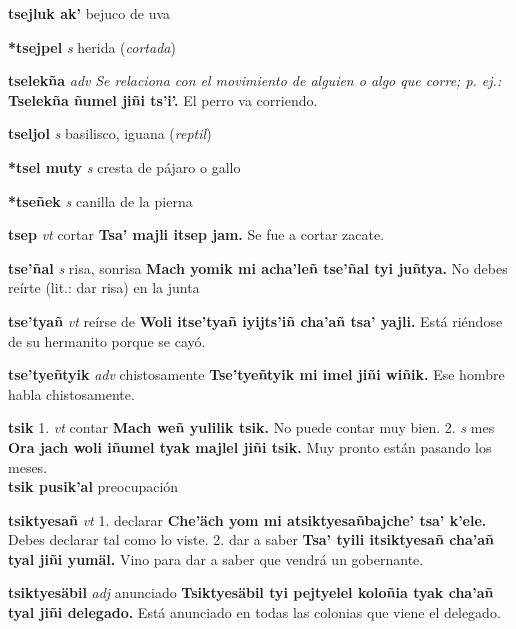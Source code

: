 \documentclass[10pt]{scrbook}
\newcommand{\entry}[1]{\textbf{#1}}
\newcommand{\onedefinition}[1]{#1.}
\newcommand{\nontranslationdef}[1]{\textit{#1}}
\newcommand{\partofspeech}[1]{\textit{#1}}
\newcommand{\spanishtranslation}[1]{#1}
\newcommand{\clarification}[1]{(\textit{#1})}
\newcommand{\cholexample}[1]{\textbf{#1}}
\newcommand{\exampletranslation}[1]{#1}
\newcommand{\secondaryentry}[1]{\\\textbf{#1}}
\newcommand{\secondtranslation}[1]{#1}
\begin{document}
\begin{multicols}{2}
\entry{tsejluk ak'}
\spanishtranslation{bejuco de uva}

\entry{*tsejpel}
\partofspeech{s}
\spanishtranslation{herida}
\clarification{cortada}

\entry{tselekña}
\partofspeech{adv}
\nontranslationdef{Se relaciona con el movimiento de alguien o algo que corre; p. ej.:}
\cholexample{Tselekña ñumel jiñi ts'i'.}
\exampletranslation{El perro va corriendo.}

\entry{tseljol}
\partofspeech{s}
\spanishtranslation{basilisco, iguana}
\clarification{reptil}

\entry{*tsel muty}
\partofspeech{s}
\spanishtranslation{cresta de pájaro o gallo}

\entry{*tseñek}
\partofspeech{s}
\spanishtranslation{canilla de la pierna}

\entry{tsep}
\partofspeech{vt}
\spanishtranslation{cortar}
\cholexample{Tsa' majli itsep jam.}
\exampletranslation{Se fue a cortar zacate.}

\entry{tse'ñal}
\partofspeech{s}
\spanishtranslation{risa, sonrisa}
\cholexample{Mach yomik mi acha'leñ tse'ñal tyi juñtya.}
\exampletranslation{No debes reírte (lit.: dar risa) en la junta}

\entry{tse'tyañ}
\partofspeech{vt}
\spanishtranslation{reírse de}
\cholexample{Woli itse'tyañ iyijts'iñ cha'añ tsa' yajli.}
\exampletranslation{Está riéndose de su hermanito porque se cayó.}

\entry{tse'tyeñtyik}
\partofspeech{adv}
\spanishtranslation{chistosamente}
\cholexample{Tse'tyeñtyik mi imel jiñi wiñik.}
\exampletranslation{Ese hombre habla chistosamente.}

\entry{tsik}
\onedefinition{1}
\partofspeech{vt}
\spanishtranslation{contar}
\cholexample{Mach weñ yulilik tsik.}
\exampletranslation{No puede contar muy bien.}
\onedefinition{2}
\partofspeech{s}
\spanishtranslation{mes}
\cholexample{Ora jach woli iñumel tyak majlel jiñi tsik.}
\exampletranslation{Muy pronto están pasando los meses.}
\secondaryentry{tsik pusik'al}
\secondtranslation{preocupación}

\entry{tsiktyesañ}
\partofspeech{vt}
\onedefinition{1}
\spanishtranslation{declarar}
\cholexample{Che'äch yom mi atsiktyesañbajche' tsa' k'ele.}
\exampletranslation{Debes declarar tal como lo viste.}
\onedefinition{2}
\spanishtranslation{dar a saber}
\cholexample{Tsa' tyili itsiktyesañ cha'añ tyal jiñi yumäl.}
\exampletranslation{Vino para dar a saber que vendrá un gobernante.}

\entry{tsiktyesäbil}
\partofspeech{adj}
\spanishtranslation{anunciado}
\cholexample{Tsiktyesäbil tyi pejtyelel koloñia tyak cha'añ tyal jiñi delegado.}
\exampletranslation{Está anunciado en todas las colonias que viene el delegado.}


\end{multicols}
\end{document}

